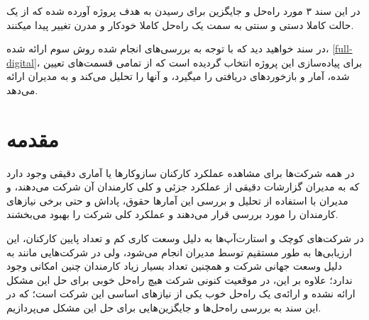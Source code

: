 \documentclass[12pt, dvipsnames, svgnames, x11names,]{article}
\begin{document}
در این سند ۳ مورد راه‌حل و جایگزین برای رسیدن به هدف پروژه آورده شده که از یک حالت کاملا دستی و سنتی به سمت یک راه‌حل کاملا خودکار و مدرن تغییر پیدا میکنند.

در سند خواهید دید که با توجه به بررسی‌های انجام شده روش سوم ارائه شده، \ref{full-digital}، برای پیاده‌سازی این پروژه انتخاب گردیده است که از تمامی قسمت‌های تعیین شده، آمار و بازخورد‌های دریافتی را میگیرد، و آنها را تحلیل می‌کند و به مدیران ارائه می‌دهد.

\section{مقدمه}
در همه شرکت‌ها برای مشاهده عملکرد کارکنان سازوکارها یا آماری دقیقی وجود دارد که به مدیران گزارشات دقیقی از عملکرد جزئی و کلی کارمندان آن شرکت می‌دهند،‌ و مدیران با استفاده از تحلیل و بررسی این آمار‌ها حقوق، پاداش و حتی برخی نیازهای کارمندان را مورد بررسی قرار می‌دهند و عملکرد کلی شرکت را بهبود می‌بخشند. 

در شرکت‌های کوچک و استارت‌آپ‌ها به دلیل وسعت کاری کم و تعداد پایین کارکنان، این ارزیابی‌ها به طور مستقیم توسط مدیران انجام می‌شود، ولی در شرکت‌هایی مانند  به دلیل وسعت جهانی شرکت و همچنین تعداد بسیار زیاد کارمندان چنین امکانی وجود ندارد؛ علاوه بر این، در موقعیت کنونی شرکت  هیچ راه‌حل خوبی برای حل این مشکل ارائه نشده و ارائه‌ی یک راه‌حل خوب یکی از نیاز‌های اساسی این شرکت است؛ که در این سند به بررسی راه‌حل‌ها  و جایگزین‌هایی برای حل این مشکل می‌پردازیم.
\end{document}

